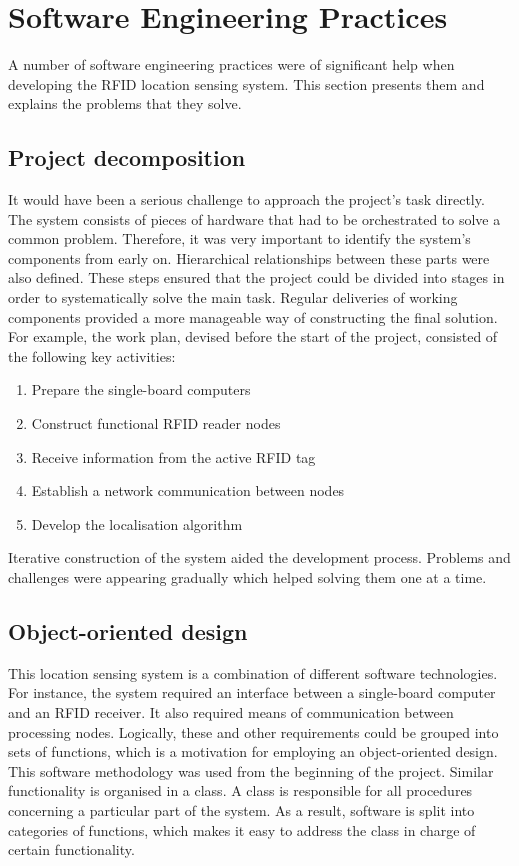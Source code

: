 \section{Software Engineering Practices}

A number of software engineering practices were of significant help when developing the RFID location sensing system. This section presents them and explains the problems that they solve.  

\subsection{Project decomposition}

It would have been a serious challenge to approach the project's task directly. The system consists of pieces of hardware that had to be orchestrated to solve a common problem. Therefore, it was very important to identify the system's components from early on. Hierarchical relationships between these parts were also defined. These steps ensured that the project could be divided into stages in order to systematically solve the main task. Regular deliveries of working components provided a more manageable way of constructing the final solution. For example, the work plan, devised before the start of the project, consisted of the following key activities:

\begin{enumerate}
 	\item Prepare the single-board computers
 	\item Construct functional RFID reader nodes
 	\item Receive information from the active RFID tag
 	\item Establish a network communication between nodes
 	\item Develop the localisation algorithm
 \end{enumerate}

Iterative construction of the system aided the development process. Problems and challenges were appearing gradually which helped solving them one at a time. 

\subsection{Object-oriented design}

This location sensing system is a combination of different software technologies. For instance, the system required an interface between a single-board computer and an RFID receiver. It also required means of communication between processing nodes. Logically, these and other requirements could be grouped into sets of functions, which is a motivation for employing an object-oriented design. This software methodology was used from the beginning of the project. Similar functionality is organised in a class. A class is responsible for all procedures concerning a particular part of the system. As a result, software is split into categories of functions, which makes it easy to address the class in charge of certain functionality.

